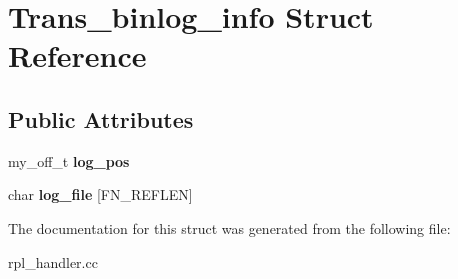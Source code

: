 \hypertarget{structTrans__binlog__info}{}\section{Trans\+\_\+binlog\+\_\+info Struct Reference}
\label{structTrans__binlog__info}
\subsection*{Public Attributes}
\begin{DoxyCompactItemize}
\item 
\mbox{\label{structTrans__binlog__info_a822716ac29dcbd1abd4220ebef09de62}} 
my\+\_\+off\+\_\+t {\bfseries log\+\_\+pos}
\item 
\mbox{\label{structTrans__binlog__info_a22b68fba00c02a924c4c68e27d5fd96b}} 
char {\bfseries log\+\_\+file} \mbox{[}F\+N\+\_\+\+R\+E\+F\+L\+EN\mbox{]}
\end{DoxyCompactItemize}


The documentation for this struct was generated from the following file\+:\begin{DoxyCompactItemize}
\item 
rpl\+\_\+handler.\+cc\end{DoxyCompactItemize}
